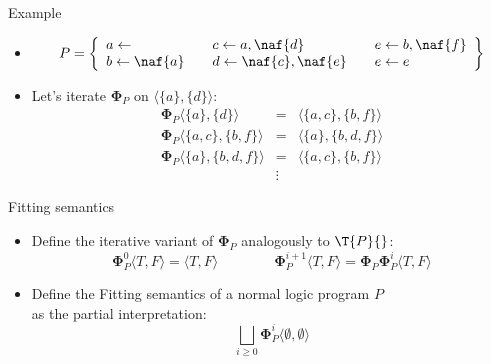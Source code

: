\begin{frame}{Example}
  \begin{itemize}
  \item<1-> []
    \[
    P
    =
    \left\{
      \begin{array}{lll}
        a \leftarrow                  \quad &
        c \leftarrow a, \naf{d}       \quad &
        e \leftarrow b, \naf{f}
        \\
        b \leftarrow \naf{a}          \quad &
        d \leftarrow \naf{c}, \naf{e} \quad &
        e \leftarrow e
      \end{array}
    \right\}
    \]
    \medskip
  \item<2-> Let's iterate ${\mathbf{\Phi}}_{P}$ on $\langle \{a\}, \{d\}\rangle$:
    \[
    \begin{array}{rcl}
    {\mathbf{\Phi}}_{P}\langle\{a\}  ,\{d\}    \rangle &=&\langle\{a, c\} ,\{b,f\}  \rangle
    \\
    {\mathbf{\Phi}}_{P}\langle\{a,c\},\{b,f\}  \rangle &=&\langle\{a\}    ,\{b,d,f\}\rangle
    \\
    {\mathbf{\Phi}}_{P}\langle\{a\}  ,\{b,d,f\}\rangle &=&\langle\{a,c\}  ,\{b,f\}  \rangle
    \\
    & \vdots &
    \end{array}
    \]
  \end{itemize}
\end{frame}
\begin{frame}{Fitting semantics}
  \bigskip
  \begin{itemize}
  \item<1-> Define the iterative variant of ${\mathbf{\Phi}}_P$ analogously to $\T{P}{}$:
    \[
    {\mathbf{\Phi}}_P^0\langle T, F \rangle = \langle T, F \rangle
    \qquad\qquad
    {\mathbf{\Phi}}_P^{i+1}\langle T, F \rangle =
    {\mathbf{\Phi}}_P{\mathbf{\Phi}}_P^i\langle T, F \rangle
    \]
  \item<2-> Define the \alert{Fitting semantics} of a normal logic program $P$\\
    as the partial interpretation:
    \[
    \textstyle{\bigsqcup_{i \geq 0}} {\mathbf{\Phi}}_P^i \langle \emptyset, \emptyset \rangle
    \]
  \end{itemize}
\end{frame}
